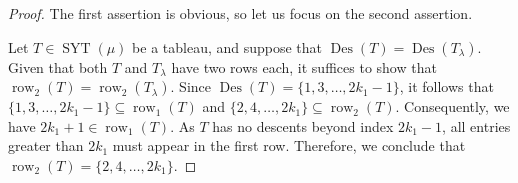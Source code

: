 \documentclass[11pt]{article}
\theoremstyle{definition}
\numberwithin{equation}{section}
\newcommand{\Des}{\operatorname{Des}}
\newcommand{\Syt}{\operatorname{SYT}}
\newcommand{\row}{\operatorname{row}}
\begin{document}
\begin{proof}
    The first assertion is obvious, so let us focus on the second assertion.

    Let $T \in \Syt(\mu)$ be a tableau, and suppose that $\Des(T) = \Des(T_\lambda)$. Given that both $T$ and $T_\lambda$ have two rows each, it suffices to show that $\row_2(T) = \row_2(T_\lambda)$. Since $\Des(T) = \{1,3,\dots,2k_1-1\}$, it follows that $\{1,3,\dots,2k_1-1\} \subseteq \row_1(T)$ and $\{2,4,\dots,2k_1\} \subseteq \row_2(T)$. Consequently, we have $2k_1+1 \in \row_1(T)$. As $T$ has no descents beyond index $2k_1-1$, all entries greater than $2k_1$ must appear in the first row. Therefore, we conclude that $\row_2(T) = \{2,4,\dots,2k_1\}$.
\end{proof}
\end{document}
